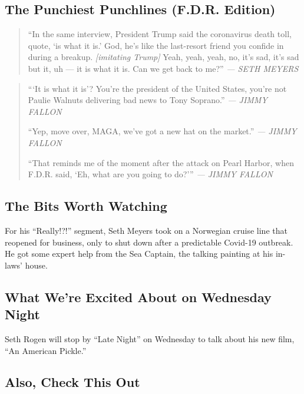 \hypertarget{the-punchiest-punchlines-fdr-edition}{%
\subsection{The Punchiest Punchlines (F.D.R.
Edition)}\label{the-punchiest-punchlines-fdr-edition}}

\begin{quote}
``In the same interview, President Trump said the coronavirus death
toll, quote, `is what it is.' God, he's like the last-resort friend you
confide in during a breakup. \emph{{[}imitating Trump{]}} Yeah, yeah,
yeah, no, it's sad, it's sad but it, uh --- it is what it is. Can we get
back to me?'' \emph{--- SETH MEYERS}
\end{quote}

\begin{quote}
```It is what it is'? You're the president of the United States, you're
not Paulie Walnuts delivering bad news to Tony Soprano.'' \emph{---
JIMMY FALLON}

``Yep, move over, MAGA, we've got a new hat on the market.'' \emph{---
JIMMY FALLON}

``That reminds me of the moment after the attack on Pearl Harbor, when
F.D.R. said, `Eh, what are you going to do?''' \emph{--- JIMMY FALLON}
\end{quote}

\hypertarget{the-bits-worth-watching}{%
\subsection{The Bits Worth Watching}\label{the-bits-worth-watching}}

For his ``Really!?!'' segment, Seth Meyers took on a Norwegian cruise
line that reopened for business, only to shut down after a predictable
Covid-19 outbreak. He got some expert help from the Sea Captain, the
talking painting at his in-laws' house.

\hypertarget{what-were-excited-about-on-wednesday-night}{%
\subsection{What We're Excited About on Wednesday
Night}\label{what-were-excited-about-on-wednesday-night}}

Seth Rogen will stop by ``Late Night'' on Wednesday to talk about his
new film, ``An American Pickle.''

\hypertarget{also-check-this-out}{%
\subsection{Also, Check This Out}\label{also-check-this-out}}

